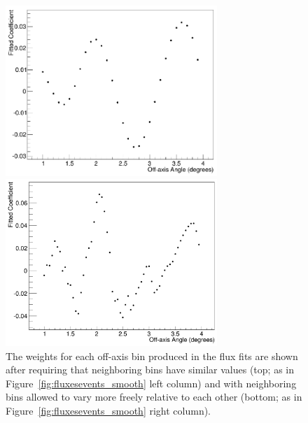 \begin{figure}[htpb]
    \begin{center}
      \includegraphics[width=8cm] {figures/weights_constrained.pdf}
    \end{center}
    \begin{center}
      \includegraphics[width=8cm] {figures/Coefficients_NewFit.png}
    \end{center}
\caption{The weights for each off-axis bin produced in the \nuprismlite flux fits are shown after requiring that neighboring bins have similar values (top; as in Figure~\ref{fig:fluxesevents_smooth} left column) and with neighboring bins allowed to vary more freely relative to each other (bottom; as in Figure~\ref{fig:fluxesevents_smooth} right column).}
\label{fig:weightvariance}
\end{figure}


